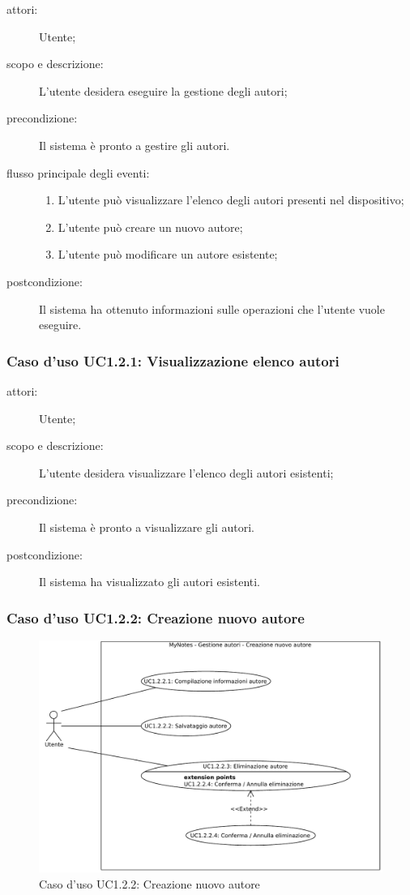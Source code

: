 \begin{description}
\item[attori:] Utente;
\item[scopo e descrizione:] L'utente desidera eseguire la gestione degli autori;
\item[precondizione:] Il sistema è pronto a gestire gli autori.
\item[flusso principale degli eventi:] \hfill 
	\begin{enumerate}
	\item L'utente può visualizzare l'elenco degli autori presenti nel dispositivo;
	\item L'utente può creare un nuovo autore;
	\item L'utente può modificare un autore esistente;
	\end{enumerate}
\item[postcondizione:] Il sistema ha ottenuto informazioni sulle operazioni che l'utente vuole eseguire.
\end{description}

\subsubsection{Caso d'uso UC1.2.1: Visualizzazione elenco autori}
\begin{description}
\item[attori:] Utente;
\item[scopo e descrizione:] L'utente desidera visualizzare l'elenco degli autori esistenti;
\item[precondizione:] Il sistema è pronto a visualizzare gli autori.
\item[postcondizione:] Il sistema ha visualizzato gli autori esistenti.
\end{description}

\subsubsection{Caso d'uso UC1.2.2: Creazione nuovo autore}
\begin{figure}[htb]
\centering
\includegraphics[scale=0.5]{gfx/useCase/MN_UC1-2-2_Creazione_nuovo_autore.pdf}
\caption{Caso d'uso UC1.2.2: Creazione nuovo autore}
\label{fig:My notes UC1.2.2}
\end{figure}

